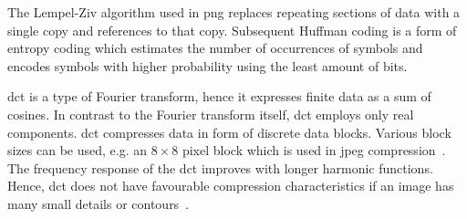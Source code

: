 The Lempel-Ziv algorithm used in \gls{png} replaces repeating sections of data with a single copy and references to that copy. Subsequent Huffman coding is a form of entropy coding which estimates the number of occurrences of symbols and encodes symbols with higher probability using the least amount of bits.

\Gls{dct} is a type of Fourier transform, hence it expresses finite data as a sum of cosines. In contrast to the Fourier transform itself, \gls{dct} employs only real components. \Gls{dct} compresses data in form of discrete data blocks. Various block sizes can be used, e.g. an $8\times8$ pixel block which is used in \gls{jpeg} compression~\cite{Bocharova2009CompressionMultimedia}. The frequency response of the \gls{dct} improves with longer harmonic functions. Hence, \gls{dct} does not have favourable compression characteristics if an image has many small details or contours~\cite{Bocharova2009CompressionMultimedia}.


